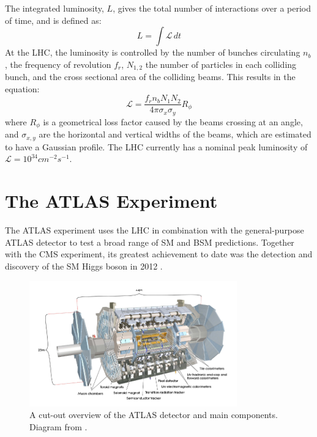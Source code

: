 The integrated luminosity, $L$, gives the total number of interactions over a period of time, and is defined as:
\begin{equation}
L = \int \mathcal{L}\, dt
\end{equation}
At the LHC, the luminosity is controlled by the number of bunches circulating $n_b$, the frequency of revolution $f_r$, $N_{1,2}$ the number of particles in each colliding bunch, and the cross sectional area of the colliding beams. This results in the equation:
\begin{equation}
\mathcal{L}  = \frac{ f_rn_bN_1N_2 }{4\pi\sigma_x\sigma_y}R_{\phi}
\end{equation}
where $R_{\phi}$ is a geometrical loss factor caused by the beams crossing at an angle, and $\sigma_{x,y}$ are the horizontal and vertical widths of the beams, which are estimated to have a Gaussian profile. The LHC currently has a nominal peak luminosity of $\mathcal{L} = 10^{34} cm^{-2}s^{-1}$.

\section{The ATLAS Experiment}
\label{section:atlas}

The ATLAS experiment \cite{ATLASDesign} uses the LHC in combination with the general-purpose ATLAS detector to test a broad range of SM and BSM predictions. Together with the CMS experiment, its greatest achievement to date was the detection and discovery of the SM Higgs boson in 2012 \cite{HiggsDiscovery}.

\begin{figure}[H]
    \centering
    \includegraphics[width=0.8\textwidth]{Figures/2/ATLASDetector.png}
    \caption{A cut-out overview of the ATLAS detector and main components. Diagram from \cite{ATLASDesign}.}
    \label{fig:atlasdec}
\end{figure}

